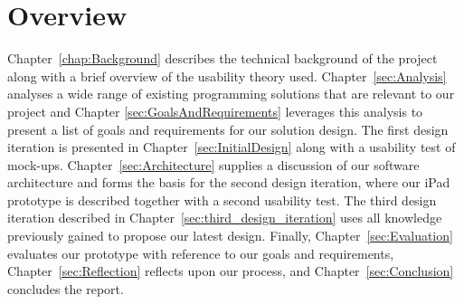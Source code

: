 \section{Overview}
Chapter~\ref{chap:Background} describes the technical background of the project along with a brief overview of the usability theory used. Chapter~\ref{sec:Analysis} analyses a
wide range of existing programming solutions that are relevant to our project and Chapter
\ref{sec:GoalsAndRequirements} leverages this analysis to present a list of
goals and requirements for our solution design. The first design
iteration is presented in Chapter~\ref{sec:InitialDesign} along with a usability test of mock-ups. Chapter~\ref{sec:Architecture}
supplies a discussion of our software architecture and forms the basis for the second design iteration, where our iPad prototype is
described together with a second usability test. The third design iteration described in Chapter~\ref{sec:third_design_iteration} uses all knowledge previously gained to propose our latest design. Finally, Chapter~\ref{sec:Evaluation}
evaluates our prototype with reference to our goals and requirements, Chapter~\ref{sec:Reflection} reflects
upon our process, and Chapter~\ref{sec:Conclusion} concludes the report.
